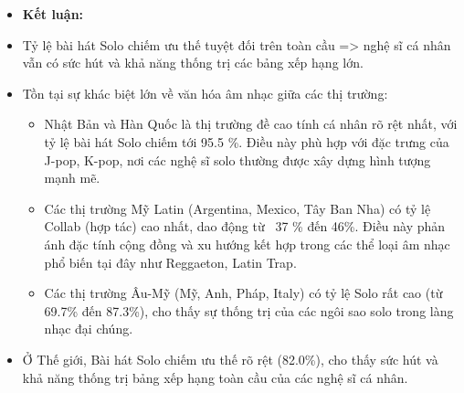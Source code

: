 \begin{itemize}
        
    
            \begin{itemize}
                 \item \textbf{Kết luận:}
                \item Tỷ lệ bài hát Solo chiếm ưu thế tuyệt đối trên toàn cầu => nghệ sĩ cá nhân vẫn có sức hút và khả năng thống trị các bảng xếp hạng lớn.
                \item Tồn tại sự khác biệt lớn về văn hóa âm nhạc giữa các thị trường:
                      \begin{itemize}
                          \item Nhật Bản và Hàn Quốc là thị trường đề cao tính cá nhân rõ rệt nhất, với tỷ lệ bài hát Solo chiếm tới 95.5 \%. Điều này phù hợp với đặc trưng của J-pop, K-pop, nơi các nghệ sĩ solo thường được xây dựng hình tượng mạnh mẽ.
                          \item Các thị trường Mỹ Latin (Argentina, Mexico, Tây Ban Nha) có tỷ lệ Collab (hợp tác) cao nhất, dao động từ ~37 \% đến 46\%. Điều này phản ánh đặc tính cộng đồng và xu hướng kết hợp trong các thể loại âm nhạc phổ biến tại đây như Reggaeton, Latin Trap.
                          \item Các thị trường Âu-Mỹ (Mỹ, Anh, Pháp, Italy) có tỷ lệ Solo rất cao (từ 69.7\% đến 87.3\%), cho thấy sự thống trị của các ngôi sao solo trong làng nhạc đại chúng.
                          
                          
                      \end{itemize}
                \item Ở Thế giới, Bài hát Solo chiếm ưu thế rõ rệt (82.0\%), cho thấy sức hút và khả năng thống trị bảng xếp hạng toàn cầu của các nghệ sĩ cá nhân.
             \end{itemize}
\end{itemize}



























